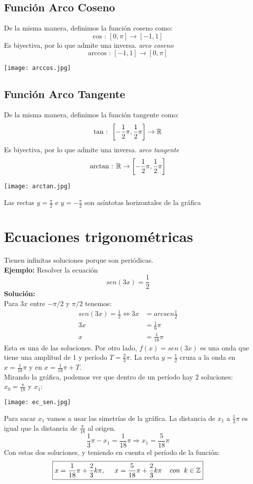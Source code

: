 \subsection{Función Arco Coseno}
De la misma manera, definimos la función coseno como:
$$\text{cos : } \left[0,\pi\right] \rightarrow [-1,1]$$
Es biyectiva, por lo que admite una inversa. \emph{arco coseno}
$$\text{arccos : } [-1,1] \rightarrow \left[0,\pi\right]$$

\begin{center}
    \texttt{[image: arccos.jpg]}
\end{center}

\subsection{Función Arco Tangente}
De la misma manera, definimos la función tangente como:
$$\text{tan : } \left[-\frac{1}{2}\pi , \frac{1}{2}\pi\right] \rightarrow {\mathbb{R}}$$
Es biyectiva, por lo que admite una inversa. \emph{arco tangente}
$$\text{arctan : } {\mathbb{R}} \rightarrow \left[-\frac{1}{2}\pi , \frac{1}{2}\pi\right]$$

\begin{center}
    \texttt{[image: arctan.jpg]}
\end{center}
Las rectas $y = \frac{\pi}{2}$ e $y = -\frac{\pi}{2}$ son asíntotas horizontales de la gráfica

\section{Ecuaciones trigonométricas}
Tienen infinitas soluciones porque son periódicas.\\

\textbf{Ejemplo:} Resolver la ecuación
$$sen(3x) = \frac{1}{2}$$
\textbf{Solución:}\\
Para $3x$ entre $-\pi/2$ y $\pi/2$ tenemos:
\begin{align*}
    sen(3x) = \frac{1}{2} \Leftrightarrow 3x &= arcsen \frac{1}{2} \\
    3x &= \frac{1}{6} \pi\\
    x &= \frac{1}{18} \pi
\end{align*}
Esta es una de las soluciones. Por otro lado, $f(x) = sen(3x)$ es una onda que tiene una amplitud de 1 y período $T = \frac{2}{3} \pi$. La recta $y = \frac{1}{2}$ cruza a la onda en $x = \frac{1}{18} \pi$ y en $x = \frac{1}{18} \pi + T$.\\

\noindent Mirando la gráfica, podemos ver que dentro de un período hay 2 soluciones: $x_0 = \frac{\pi}{18}$ y $x_1$:
\begin{center}
    \texttt{[image: ec\_sen.jpg]}
\end{center}

Para sacar $x_1$ vamos a usar las simetrías de la gráfica. La distancia de $x_1$ a $\frac{1}{3}\pi$ es igual que la distancia de $\frac{\pi}{18}$ al origen.
$$\frac{1}{3}\pi - x_1 = \frac{1}{18}\pi \Rightarrow \boxed{x_1 = \frac{5}{18}\pi}$$
Con estas dos soluciones, y teniendo en cuenta el período de la función:
$$\boxed{x = \frac{1}{18}\pi + \frac{2}{3}k \pi, \;\;\;\;\; x = \frac{5}{18}\pi + \frac{2}{3}k \pi \;\;\;\; con \;\; k \in {\mathbb{Z}}}$$